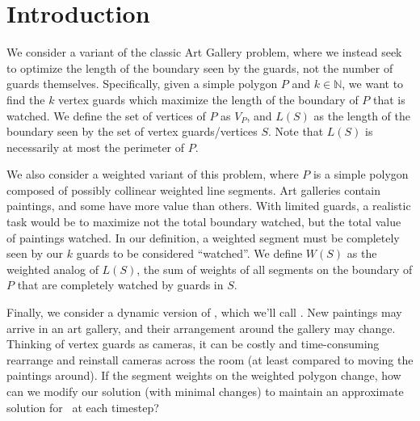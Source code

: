 \section{Introduction}
We consider a variant of the classic Art Gallery problem, where we instead seek to optimize the length of the boundary seen by the guards, not the number of guards themselves. Specifically, given a simple polygon $P$ and $k\in\mathbb{N}$, we want to find the $k$ vertex guards which maximize the length of the boundary of $P$ that is watched. We define the set of vertices of $P$ as $V_P$, and $L(S)$ as the length of the boundary seen by the set of vertex guards/vertices $S$. Note that $L(S)$ is necessarily at most the perimeter of $P$. 


We also consider a weighted variant of this problem, where $P$ is a simple polygon composed of possibly collinear weighted line segments. Art galleries contain paintings, and some have more value than others. With limited guards, a realistic task would be to maximize not the total boundary watched, but the total value of paintings watched. In our definition, a weighted segment must be completely seen by our $k$ guards to be considered ``watched''. We define $W(S)$ as the weighted analog of $L(S)$, the sum of weights of all segments on the boundary of $P$ that are completely watched by guards in $S$.


Finally, we consider a dynamic version of \MVVG, which we'll call \DMVVG. New paintings may arrive in an art gallery, and their arrangement around the gallery may change. Thinking of vertex guards as cameras, it can be costly and time-consuming rearrange and reinstall cameras across the room (at least compared to moving the paintings around). If the segment weights on the weighted polygon change, how can we modify our solution (with minimal changes) to maintain an approximate solution for \MVVG\ at each timestep?


